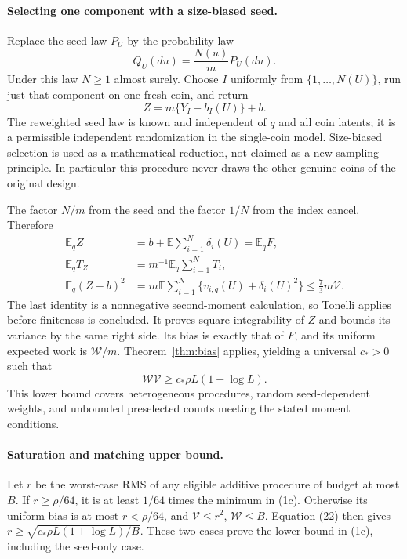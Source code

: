 \documentclass[11pt]{article}
\newcommand{\E}{\mathbb E}
\begin{document}
\paragraph{Selecting one component with a size-biased seed.}
Replace the seed law $P_U$ by the probability law
\[
 Q_U(du)=\frac{N(u)}{m}P_U(du).
\]
Under this law $N\ge1$ almost surely. Choose $I$ uniformly from
$\{1,\ldots,N(U)\}$, run just that component on one fresh coin, and return
\[
 Z=m\{Y_I-b_I(U)\}+b.                                  \tag{20}
\]
The reweighted seed law is known and independent of $q$ and all coin latents;
it is a permissible independent randomization in the single-coin model.
Size-biased selection is used as a mathematical reduction, not claimed as a
new sampling principle. In particular this procedure never draws the other
genuine coins of the original design.

The factor $N/m$ from the seed and the factor $1/N$ from the index cancel.
Therefore
\begin{align*}
 \E_qZ
 &=b+\E\sum_{i=1}^N\delta_i(U)=\E_qF,\\
 \E_qT_Z
 &=m^{-1}\E_q\sum_{i=1}^NT_i,\\
 \E_q(Z-b)^2
 &=m\E\sum_{i=1}^N\{v_{i,q}(U)+\delta_i(U)^2\}
 \le\tfrac73m\mathcal V.                              \tag{21}
\end{align*}
The last identity is a nonnegative second-moment calculation, so Tonelli
applies before finiteness is concluded. It proves square integrability of
$Z$ and bounds its variance by the same right side. Its bias is exactly
that of $F$, and its uniform expected work is $\mathcal W/m$.
Theorem~\ref{thm:bias} applies, yielding a universal $c_*>0$ such that
\[
 \mathcal W\mathcal V
 \ge c_*\rho L(1+\log L).                              \tag{22}
\]
This lower bound covers heterogeneous procedures, random seed-dependent
weights, and unbounded preselected counts meeting the stated moment conditions.

\paragraph{Saturation and matching upper bound.}
Let $r$ be the worst-case RMS of any eligible additive procedure of budget
at most $B$. If $r\ge\rho/64$, it is at least $1/64$ times the minimum in
(1c). Otherwise its uniform bias is at most $r<\rho/64$, and
$\mathcal V\le r^2$, $\mathcal W\le B$. Equation (22) then gives
$r\ge\sqrt{c_*\rho L(1+\log L)/B}$. These two cases prove the lower
bound in (1c), including the seed-only case.
\end{document}
